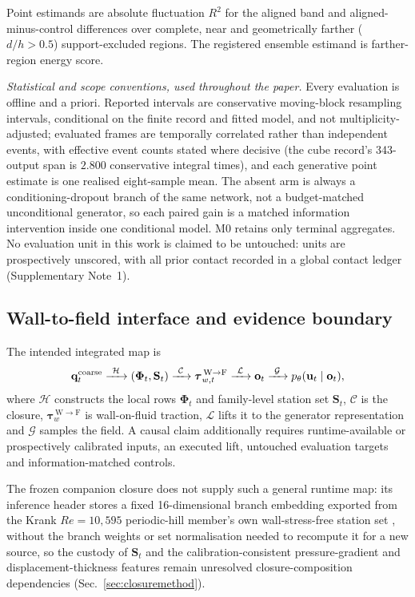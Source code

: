 Point estimands are absolute fluctuation $R^2$ for the aligned band and aligned-minus-control differences over complete, near and geometrically
farther ($d/h>0.5$) support-excluded regions. The registered ensemble estimand is farther-region
energy score.

\emph{Statistical and scope conventions, used throughout the paper.} Every evaluation is
offline and a priori. Reported intervals are conservative moving-block resampling intervals,
conditional on the finite record and fitted model, and not multiplicity-adjusted; evaluated
frames are temporally correlated rather than independent events, with effective event counts
stated where decisive (the cube record's 343-output span is $2.800$ conservative integral
times), and each generative point estimate is one realised eight-sample mean. The absent arm is always
a conditioning-dropout branch of the same network, not a budget-matched unconditional
generator, so each paired gain is a matched information intervention inside one conditional
model. M0 retains only terminal aggregates. No evaluation unit in this work is claimed to be
untouched: units are prospectively unscored, with all prior contact recorded in a global
contact ledger (Supplementary Note~1).

\subsection{Wall-to-field interface and evidence boundary}\label{sec:interfaceaudit}

The intended integrated map is
\begin{equation}
\mathbf q_t^{\rm coarse}
\xrightarrow{\ \mathcal H\ }
(\boldsymbol\Phi_t,\mathbf S_t)
\xrightarrow{\ \mathcal C\ }
\boldsymbol\tau_{w,t}^{\,\mathrm{W\to F}}
\xrightarrow{\ \mathcal L\ }
\mathbf o_t
\xrightarrow{\ \mathcal G\ }
p_\theta(\mathbf u_t\mid\mathbf o_t),
\label{eq:integrated}
\end{equation}
where $\mathcal H$ constructs the local rows $\boldsymbol\Phi_t$ and family-level station set
$\mathbf S_t$, $\mathcal C$ is the closure,
$\boldsymbol\tau_w^{\,\mathrm{W\to F}}$ is wall-on-fluid traction, $\mathcal L$ lifts it to the
generator representation and $\mathcal G$ samples the field. A causal claim additionally requires
runtime-available or prospectively calibrated inputs, an executed lift, untouched evaluation
targets and information-matched controls.

The frozen companion closure does not supply such a general runtime map: its inference header
stores a fixed 16-dimensional branch embedding exported from the Krank $Re=10{,}595$
periodic-hill member's own wall-stress-free station set \cite{krank2018hills}, without the branch weights or set normalisation needed to recompute
it for a new source, so the custody of $\mathbf S_t$ and the calibration-consistent
pressure-gradient and displacement-thickness features remain unresolved closure-composition dependencies
(Sec.~\ref{sec:closuremethod}).

